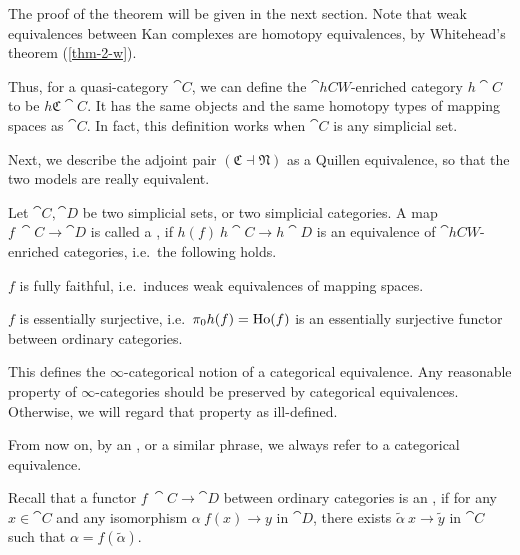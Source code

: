 The proof of the theorem will be given in the next section.
Note that weak equivalences between Kan complexes
are homotopy equivalences,
by Whitehead's theorem (\ref{thm-2-w}).

Thus, for a quasi-category $\cat C$, we can define the 
$\cat{hCW}$-enriched category $h\cat C$ to be $h\mathfrak C\cat C$.
It has the same objects and the same homotopy types of mapping spaces as $\cat C$.
In fact, this definition works when $\cat C$ is any simplicial set.

Next, we describe the adjoint pair $(\mathfrak C\dashv\mathfrak N)$
as a Quillen equivalence,
so that the two models are really equivalent.

\begin{definition}
    Let $\cat C,\cat D$ be two simplicial sets, or two simplicial categories.
    A map $f\:\cat C\to\cat D$ is called a ,
    if $h(f)\:h\cat C\to h\cat D$
    is an equivalence of $\cat{hCW}$-enriched categories, i.e.\ the following holds.
    \begin{itms}
        \item $f$ is fully faithful, i.e.\ induces weak equivalences of mapping spaces.
        \item $f$ is essentially surjective, i.e.\ $\pi_0h(f)=\operatorname{Ho}(f)$
        is an essentially surjective functor between ordinary categories.
    \end{itms}
\end{definition}

\begin{remark}
    This defines the $\infty$-categorical notion
    of a categorical equivalence.
    Any reasonable property of $\infty$-categories
    should be preserved by categorical equivalences.
    Otherwise, we will regard that property as ill-defined.
    \varqed
\end{remark}

From now on, by an ,
or a similar phrase, we always refer to a categorical equivalence.

Recall that a functor $f\:\cat C\to\cat D$ between ordinary categories is an ,
if for any $x\in\cat C$ and any isomorphism $\alpha\:f(x)\to y$ in $\cat D$,
there exists $\tilde\alpha\:x\to\tilde y$ in $\cat C$ such that $\alpha=f(\tilde\alpha)$.

